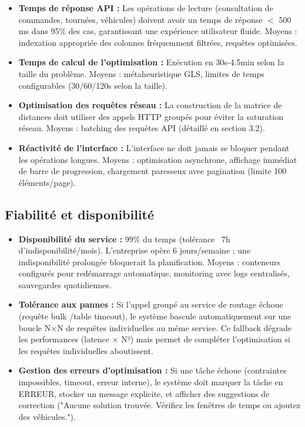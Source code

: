 \documentclass[12pt,a4paper]{report}
\begin{document}
\begin{itemize}[leftmargin=2.2em]
    \item \textbf{Temps de réponse API :} Les opérations de lecture (consultation de commandes, tournées, véhicules) doivent avoir un temps de réponse $<$ 500 ms dans 95\% des cas, garantissant une expérience utilisateur fluide. Moyens : indexation appropriée des colonnes fréquemment filtrées, requêtes optimisées.

    \item \textbf{Temps de calcul de l'optimisation :} Exécution en 30s-4.5min selon la taille du problème. Moyens : métaheuristique GLS, limites de temps configurables (30/60/120s selon la taille).

    \item \textbf{Optimisation des requêtes réseau :} La construction de la matrice de distances doit utiliser des appels HTTP groupés pour éviter la saturation réseau. Moyens : batching des requêtes API (détaillé en section 3.2).

    \item \textbf{Réactivité de l'interface :} L'interface ne doit jamais se bloquer pendant les opérations longues. Moyens : optimisation asynchrone, affichage immédiat de barre de progression, chargement paresseux avec pagination (limite 100 éléments/page).
\end{itemize}

\subsection{Fiabilité et disponibilité}

\begin{itemize}[leftmargin=2.2em]
    \item \textbf{Disponibilité du service :} 99\% du temps (tolérance ~7h d'indisponibilité/mois). L'entreprise opère 6 jours/semaine ; une indisponibilité prolongée bloquerait la planification. Moyens : conteneurs configurés pour redémarrage automatique, monitoring avec logs centralisés, sauvegardes quotidiennes.

    \item \textbf{Tolérance aux pannes :} Si l'appel groupé au service de routage échoue (requête bulk /table timeout), le système bascule automatiquement sur une boucle N×N de requêtes individuelles au même service. Ce fallback dégrade les performances (latence × N²) mais permet de compléter l'optimisation si les requêtes individuelles aboutissent.

    \item \textbf{Gestion des erreurs d'optimisation :} Si une tâche échoue (contraintes impossibles, timeout, erreur interne), le système doit marquer la tâche en ERREUR, stocker un message explicite, et afficher des suggestions de correction ("Aucune solution trouvée. Vérifiez les fenêtres de temps ou ajoutez des véhicules.").
\end{itemize}
\end{document}
